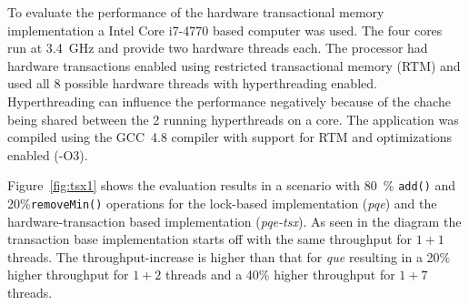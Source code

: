 To evaluate the performance of the hardware transactional memory implementation a Intel Core i7-4770 based computer was used. The four cores run at 3.4~GHz and provide two hardware threads each. The processor had hardware transactions enabled  using restricted transactional memory (RTM) and used all 8 possible hardware threads with hyperthreading enabled. Hyperthreading can influence the performance negatively because of the chache being shared between the 2 running hyperthreads on a core. The application was compiled using the GCC~4.8 compiler with support for RTM and optimizations enabled (-O3).

Figure~\ref{fig:tsx1} shows the evaluation results in a scenario with 80~\% \texttt{add()} and 20\%\texttt{removeMin()} operations for the lock-based implementation (\textit{pqe}) and the hardware-transaction based implementation (\textit{pqe-tsx}). As seen in the diagram the transaction base implementation starts off with the same throughput for $1+1$ threads. The throughput-increase is higher than that for \textit{que} resulting in a 20\% higher throughput for $1+2$ threads and a 40\% higher throughput for $1+7$ threads.

